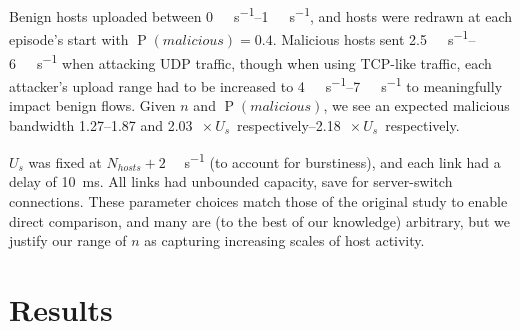 \documentclass[10pt, times, conference, letterpaper]{IEEEtran}
\begin{document}
Benign hosts uploaded between \SIrange{0}{1}{\mega\bit\per\second}, and hosts were redrawn at each episode's start with $\operatorname{P}(\mathit{malicious})=0.4$.
Malicious hosts sent \SIrange{2.5}{6}{\mega\bit\per\second} when attacking UDP traffic, though when using TCP-like traffic, each attacker's upload range had to be increased to \SIrange{4}{7}{\mega\bit\per\second} to meaningfully impact benign flows.
Given $n$ and $\operatorname{P}(\mathit{malicious})$, we see an expected malicious bandwidth \numrange{1.27}{1.87} and \SIrange{2.03}{2.18}{$\! \times U_s$} respectively.

$U_s$ was fixed at $N_{\mathit{hosts}}+2$ \si{\mega\bit\per\second} (to account for burstiness), and each link had a delay of \SI{10}{\milli\second}.
All links had unbounded capacity, save for server-switch connections.
These parameter choices match those of the original study to enable direct comparison, and many are (to the best of our knowledge) arbitrary, but we justify our range of $n$ as capturing increasing scales of host activity.

\section{Results}
\label{sec:the-results-of-doing-so}
\end{document}
